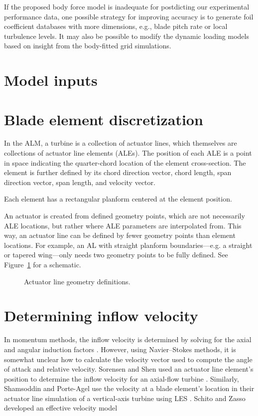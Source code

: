 If the proposed body force model is inadequate for postdicting our experimental
performance data, one possible strategy for improving accuracy is to generate
foil coefficient databases with more dimensions, e.g., blade pitch rate or local
turbulence levels. It may also be possible to modify the dynamic loading models
based on insight from the body-fitted grid simulations.


\section{Model inputs}


\section{Blade element discretization}

In the ALM, a turbine is a collection of actuator lines, which themselves are
collections of actuator line elements (ALEs). The position of each ALE is a
point in space indicating the quarter-chord location of the element
cross-section. The element is further defined by its chord direction vector,
chord length, span direction vector, span length, and velocity vector.

Each element has a rectangular planform centered at the element position.

An actuator is created from defined geometry points, which are not necessarily
ALE locations, but rather where ALE parameters are interpolated from. This way,
an actuator line can be defined by fewer geometry points than element locations.
For example, an AL with straight planform boundaries---e.g. a straight or
tapered wing---only needs two geometry points to be fully defined. See
Figure~\ref{fig:AL-geom} for a schematic.

\begin{figure}[ht]
    \caption{Actuator line geometry definitions.}
    
    \label{fig:AL-geom}
\end{figure}

\section{Determining inflow velocity}

In momentum methods, the inflow velocity is determined by solving for the axial
and angular induction factors \cite{Manwell2002}. However, using Navier--Stokes
methods, it is somewhat unclear how to calculate the velocity vector used to
compute the angle of attack and relative velocity. Sorensen and Shen used an
actuator line element's position to determine the inflow velocity for an
axial-flow turbine \cite{Sorensen2002}. Similarly, Shamsoddin and Porte-Agel use
the velocity at a blade element's location in their actuator line simulation of
a vertical-axis turbine using LES \cite{Shamsoddin2014}. Schito and Zasso
developed an effective velocity model \cite{Schito2014}

